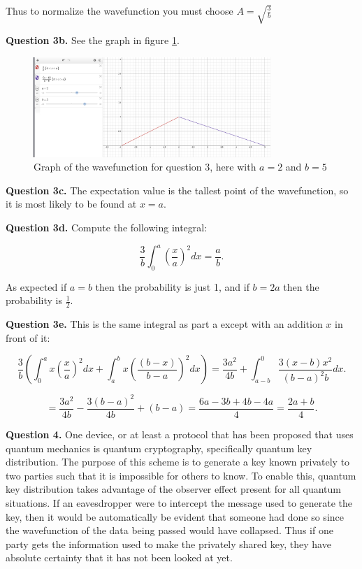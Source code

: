 \documentclass[letterpaper, reqno,11pt]{article}
\begin{document}
Thus to normalize the wavefunction you must choose $A=\sqrt{\frac{3}{b}}$

{\noindent\bf Question 3b.} See the graph in figure \ref{fig:q3}. 

\begin{figure}[htpb]
    \centering
    \includegraphics[width=0.8\textwidth]{q3}
    \caption{Graph of the wavefunction for question 3, here with $a=2$ and $b=5$}
    \label{fig:q3}
\end{figure}

{\noindent\bf Question 3c.} The expectation value is the tallest point of the wavefunction, so it is most likely to be found at $x=a$. 

{\noindent\bf Question 3d.} Compute the following integral: 

\[
\frac{3}{b}\int_0^a \left( \frac{x}{a} \right) ^2dx=\frac{a}{b}
.\] 

As expected if $a=b$ then the probability is just 1, and if $b=2a$ then the probability is $\frac{1}{2}$. 

{\noindent\bf Question 3e.} This is the same integral as part a except with an addition $x$ in front of it: 

\[
\frac{3}{b}\left(\int_0^a x\left(\frac{x}{a}\right)^2dx + \int_a^b x\left(\frac{(b-x)}{b-a}\right)^2dx\right)=\frac{3a^2}{4b}+\int_{a-b}^0\frac{3(x-b)x^2}{(b-a)^2b}dx
.\] 

\[
=\frac{3a^2}{4b}-\frac{3(b-a)^2}{4b}+(b-a)=\frac{6a-3b+4b-4a}{4}=\frac{2a+b}{4}
.\] 

{\noindent\bf Question 4.} One device, or at least a protocol that has been proposed that uses quantum mechanics is quantum cryptography, specifically quantum key distribution. The purpose of this scheme is to generate a key known privately to two parties such that it is impossible for others to know. To enable this, quantum key distribution takes advantage of the observer effect present for all quantum situations. If an eavesdropper were to intercept the message used to generate the key, then it would be automatically be evident that someone had done so since the wavefunction of the data being passed would have collapsed. Thus if one party gets the information used to make the privately shared key, they have absolute certainty that it has not been looked at yet.  
\end{document}
